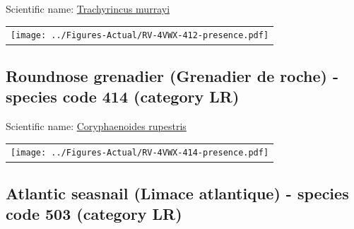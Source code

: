 \documentclass[12pt]{article}\usepackage[]{graphicx}\usepackage[]{color}
\begin{document}

Scientific name: \href{http://www.marinespecies.org/aphia.php?p=taxdetails\&id=126481}{Trachyrincus murrayi} \newline
\begin{minipage}{1.0\textwidth}
 \begin{tabular}{c}
\texttt{[image: ../Figures-Actual/RV-4VWX-412-presence.pdf]} \\ 
\end{tabular} 
\end{minipage}
\clearpage

\renewcommand\thefigure{\thesubsection\Alph{figure}}

\setcounter{figure}{0}

\hypertarget{sec:414}{%
\subsection{Roundnose grenadier (Grenadier de roche) - species code 414 (category LR)}\label{sec:414}}

  


Scientific name: \href{http://www.marinespecies.org/aphia.php?p=taxdetails\&id=158960}{Coryphaenoides rupestris} \newline
\begin{minipage}{1.0\textwidth}
 \begin{tabular}{c}
\texttt{[image: ../Figures-Actual/RV-4VWX-414-presence.pdf]} \\ 
\end{tabular} 
\end{minipage}
\clearpage

\renewcommand\thefigure{\thesubsection\Alph{figure}}

\setcounter{figure}{0}

\hypertarget{sec:503}{%
\subsection{Atlantic seasnail (Limace atlantique) - species code 503 (category LR)}\label{sec:503}}

  
\end{document}
